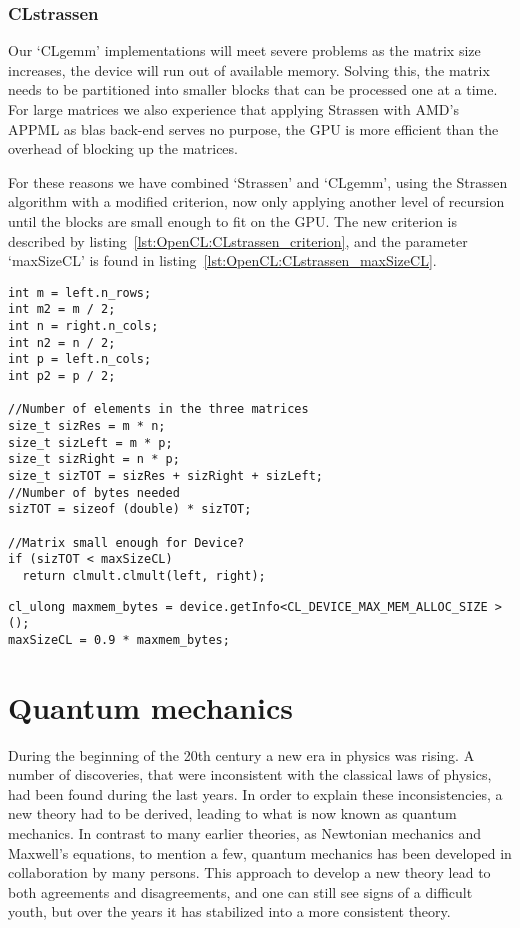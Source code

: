 \subsection{CLstrassen}
Our `CLgemm' implementations will meet severe problems as the matrix size increases, the device will run out of available memory. 
Solving this, the matrix needs to be partitioned into smaller blocks that can be processed one at a time.
For large matrices we also experience that applying Strassen with AMD's APPML as blas back-end serves no purpose, the GPU is more efficient than the overhead of blocking up the matrices.

For these reasons we have combined `Strassen' and `CLgemm', using the Strassen algorithm with a modified criterion, now only applying another level of recursion until the blocks are small enough to fit on the GPU.
The new criterion is described by listing~\ref{lst:OpenCL:CLstrassen_criterion}, and the parameter `maxSizeCL' is found in listing~\ref{lst:OpenCL:CLstrassen_maxSizeCL}.
\begin{lstlisting}[float,label={lst:OpenCL:CLstrassen_criterion},caption={CLstrassen's new criterion.}]
int m = left.n_rows;
int m2 = m / 2;
int n = right.n_cols;
int n2 = n / 2;
int p = left.n_cols;
int p2 = p / 2;

//Number of elements in the three matrices
size_t sizRes = m * n;
size_t sizLeft = m * p;
size_t sizRight = n * p;
size_t sizTOT = sizRes + sizRight + sizLeft;
//Number of bytes needed
sizTOT = sizeof (double) * sizTOT;

//Matrix small enough for Device?
if (sizTOT < maxSizeCL)
  return clmult.clmult(left, right); 
\end{lstlisting}
\begin{lstlisting}[float,label={lst:OpenCL:CLstrassen_maxSizeCL},caption={How to query the max number of bytes on a GPU device available for OpenCL.}]
cl_ulong maxmem_bytes = device.getInfo<CL_DEVICE_MAX_MEM_ALLOC_SIZE > ();
maxSizeCL = 0.9 * maxmem_bytes;
\end{lstlisting}













\chapter{Quantum mechanics}
During the beginning of the 20th century a new era in physics was rising.
A number of discoveries, that were inconsistent with the classical laws of physics, had been found during the last years.
In order to explain these inconsistencies, a new theory had to be derived, leading to what is now known as quantum mechanics.
In contrast to many earlier theories, as Newtonian mechanics and Maxwell's equations, to mention a few, quantum mechanics has been developed in collaboration by many persons.
This approach to develop a new theory lead to both agreements and disagreements, and one can still see signs of a difficult youth, but over the years it has stabilized into a more consistent theory.



